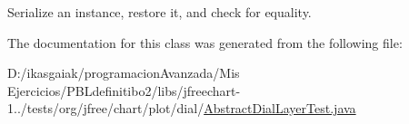 Serialize an instance, restore it, and check for equality. 

The documentation for this class was generated from the following file\+:\begin{DoxyCompactItemize}
\item 
D\+:/ikasgaiak/programacion\+Avanzada/\+Mis Ejercicios/\+P\+B\+Ldefinitibo2/libs/jfreechart-\/1../tests/org/jfree/chart/plot/dial/\mbox{\hyperlink{_abstract_dial_layer_test_8java}{Abstract\+Dial\+Layer\+Test.\+java}}\end{DoxyCompactItemize}
